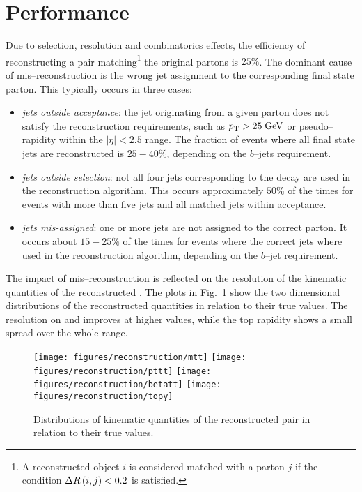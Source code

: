 \section{Performance}

Due to selection, resolution and combinatorics effects, the efficiency
of reconstructing a \ttbar{} pair matching\footnote{A reconstructed
  object $i$ is considered matched with a parton $j$ if the condition
  $\Delta{}R\left(i, j\right)<0.2$ is satisfied.} the original partons is
$25\%$. The dominant cause of mis--reconstruction is the wrong jet
assignment to the corresponding \ttbar{} final state parton. This
typically occurs in three cases:
\begin{itemize}
\item {\it jets outside acceptance}: the jet originating from a given
  parton does not satisfy the reconstruction requirements, such as
  $p_{\mathrm{T}}{}>25 \; \mathrm{GeV}$ or pseudo--rapidity within the $|\eta|<2.5$ range.
  The fraction of events where all \ttbar{} final state jets are
  reconstructed is $25-40\%$, depending on the $b$--jets requirement.
\item {\it jets outside selection}: not all four jets corresponding to
  the \ttbar{} decay are used in the reconstruction algorithm.
  This occurs approximately $50\%$ of the times for events with more
  than five jets and all matched jets within acceptance.
\item {\it jets mis-assigned}: one or more jets are not assigned to
  the correct parton. It occurs about $15-25\%$ of the times for
  events where the correct jets where used in the reconstruction
  algorithm, depending on the $b$--jet requirement.
\end{itemize}

The impact of mis--reconstruction is reflected on the resolution of
the kinematic quantities of the reconstructed \ttbar. The plots
in Fig.~\ref{fig:reso} show the two dimensional distributions of the
reconstructed quantities in relation to their true values. The
resolution on \mtt{} and \pttt{} improves at higher values, while the
top rapidity shows a small spread over the whole range.

\begin{figure}[!htb]\centering
  \texttt{[image: figures/reconstruction/mtt]}
  \texttt{[image: figures/reconstruction/pttt]}
  \texttt{[image: figures/reconstruction/betatt]}
  \texttt{[image: figures/reconstruction/topy]}
  \caption{
    \label{fig:reso}
    Distributions of kinematic quantities of the
    reconstructed \ttbar{} pair in relation to their true values.
  }
\end{figure} 

